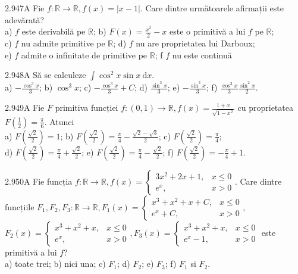 \documentclass[11pt]{article}
\begin{document}
2.947A Fie $f: \mathbb{R} \rightarrow \mathbb{R}, f(x)=|x-1|$. Care dintre următoarele afirmații este adevărată?\\ a) $f$ este derivabilă pe $\mathbb{R}$; b) $F(x)=\frac{x^{2}}{2}-x$ este o primitivă a lui $f$ pe $\mathbb{R}$;\\ c) $f$ nu admite primitive pe $\mathbb{R}$; d) $f$ nu are proprietatea lui Darboux;\\ e) $f$ admite o infinitate de primitive pe $\mathbb{R}$; f $f$ nu este continuă

2.948A Să se calculeze $\int \cos ^{2} x \sin x \mathrm{~d} x$.\\ a) $-\frac{\cos ^{3} x}{3}$; b) $\cos ^{3} x$; c) $-\frac{\cos ^{3} x}{3}+C$; d) $\frac{\sin ^{3} x}{3}$; e) $-\frac{\sin ^{3} x}{3}$; f) $\frac{\cos ^{3} x}{3} \frac{\sin ^{2} x}{2}$.

2.949A Fie $F$ primitiva funcției $f:(0,1) \rightarrow \mathbb{R}, f(x)=\frac{1+x}{\sqrt{1-x^{2}}}$ cu proprietatea $F\left(\frac{1}{2}\right)=\frac{\pi}{6}$. Atunci\\ a) $F\left(\frac{\sqrt{2}}{2}\right)=1$; b) $F\left(\frac{\sqrt{2}}{2}\right)=\frac{\pi}{4}-\frac{\sqrt{2}-\sqrt{3}}{2}$; c) $F\left(\frac{\sqrt{2}}{2}\right)=\frac{\pi}{4}$;\\ d) $F\left(\frac{\sqrt{2}}{2}\right)=\frac{\pi}{4}+\frac{\sqrt{2}}{2}$; e) $F\left(\frac{\sqrt{2}}{2}\right)=\frac{\pi}{4}-\frac{\sqrt{2}}{2}$; f) $F\left(\frac{\sqrt{2}}{2}\right)=-\frac{\pi}{4}+1$.

2.950A Fie funcția $f: \mathbb{R} \rightarrow \mathbb{R}, f(x)=\left\{\begin{array}{ll}3 x^{2}+2 x+1, & x \leq 0 \\ e^{x}, & x>0\end{array}\right.$. Care dintre funcțiile $F_{1}, F_{2}, F_{3}: \mathbb{R} \rightarrow \mathbb{R}, F_{1}(x)=\left\{\begin{array}{ll}x^{3}+x^{2}+x+C, & x \leq 0 \\ e^{x}+C, & x>0\end{array}\right.$, $F_{2}(x)=\left\{\begin{array}{ll}x^{3}+x^{2}+x, & x \leq 0 \\ e^{x}, & x>0\end{array}, F_{3}(x)=\left\{\begin{array}{ll}x^{3}+x^{2}+x, & x \leq 0 \\ e^{x}-1, & x>0\end{array}\right.\right.$ este primitivă a lui $f$?\\ a) toate trei; b) nici una; c) $F_{1}$; d) $F_{2}$; e) $F_{3}$; f) $F_{1}$ si $F_{2}$.
\end{document}
